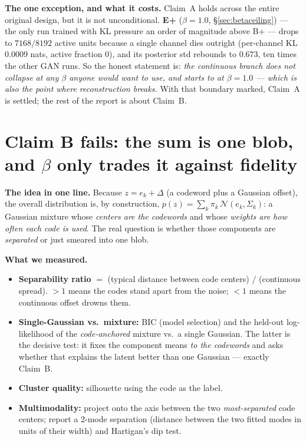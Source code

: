 \documentclass[11pt]{article}
\begin{document}
\textbf{The one exception, and what it costs.} Claim~A holds across the entire original design,
but it is not unconditional. \textbf{E+} ($\beta{=}1.0$, \S\ref{sec:betaceiling}) --- the only run
trained with KL pressure an order of magnitude above B+ --- drops to $7168/8192$ active units
because a single channel dies outright (per-channel KL $0.0009$ nats, active fraction $0$), and its
posterior std rebounds to $0.673$, ten times the other GAN runs. So the honest statement is:
\emph{the continuous branch does not collapse at any $\beta$ anyone would want to use, and starts
to at $\beta=1.0$ --- which is also the point where reconstruction breaks.} With that boundary
marked, Claim~A is settled; the rest of the report is about Claim~B.

\section{Claim B fails: the sum is one blob, and $\beta$ only trades it against fidelity}
\label{sec:mixture}
\textbf{The idea in one line.} Because $z = e_k + \Delta$ (a codeword plus a Gaussian
offset), the overall distribution is, by construction,
$p(z)=\sum_k \pi_k\,\mathcal{N}(e_k,\Sigma_k)$: a Gaussian mixture whose \emph{centers are
the codewords} and whose \emph{weights are how often each code is used}. The real question
is whether those components are \emph{separated} or just smeared into one blob.

\textbf{What we measured.}
\begin{itemize}
  \item \textbf{Separability ratio} $=$ (typical distance between code centers) $/$
  (continuous spread). $>1$ means the codes stand apart from the noise; $<1$ means the
  continuous offset drowns them.
  \item \textbf{Single-Gaussian vs.\ mixture:} BIC (model selection) and the held-out
  log-likelihood of the \emph{code-anchored} mixture vs.\ a single Gaussian. The latter is the
  decisive test: it fixes the component means \emph{to the codewords} and asks whether that
  explains the latent better than one Gaussian --- exactly Claim~B.
  \item \textbf{Cluster quality:} silhouette using the code as the label.
  \item \textbf{Multimodality:} project onto the axis between the two \emph{most-separated}
  code centers; report a 2-mode separation (distance between the two fitted modes in units
  of their width) and Hartigan's dip test.
\end{itemize}
\end{document}
